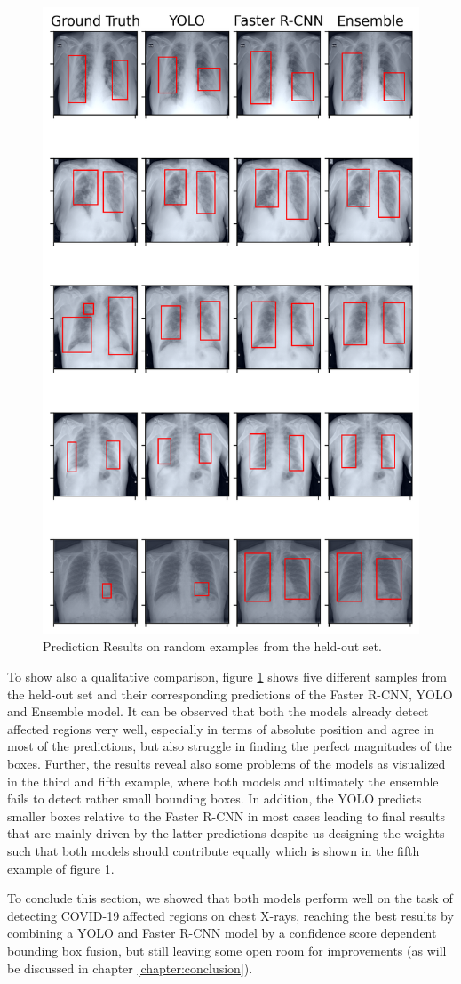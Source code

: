 \begin{figure}[h!]
	\centering
	\includegraphics[width=0.6\linewidth]{img/combo.png}
	\caption{Prediction Results on random examples from the held-out set.}
	\label{fig:combo_eval}
\end{figure}

To show also a qualitative comparison, figure \ref{fig:combo_eval} shows five different samples from the held-out set and their corresponding predictions of the Faster \ac{R-CNN}, \ac{YOLO} and Ensemble model. It can be observed that both the models already detect affected regions very well, especially in terms of absolute position and agree in most of the predictions, but also struggle in finding the perfect magnitudes of the boxes. Further, the results reveal also some problems of the models as visualized in the third and fifth example, where both models and ultimately the ensemble fails to detect rather small bounding boxes. In addition, the \ac{YOLO} predicts smaller boxes relative to the Faster \ac{R-CNN} in most cases leading to final results that are mainly driven by the latter predictions despite us designing the weights such that both models should contribute equally which is shown in the fifth example of figure \ref{fig:combo_eval}. 

To conclude this section, we showed that both models perform well on the task of detecting COVID-19 affected regions on chest X-rays, reaching the best results by combining a \ac{YOLO} and Faster \ac{R-CNN} model by a confidence score dependent bounding box fusion, but still leaving some open room for improvements (as will be discussed in chapter \ref{chapter:conclusion}).

